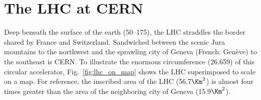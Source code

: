 \section{The LHC at CERN}
Deep beneath the surface of the earth (50--175\meter), the LHC straddles the border shared by France and Switzerland.
Sandwiched between the scenic Jura mountains to the northwest and the sprawling city of Geneva (French: Genève) to the southeast is CERN.
To illustrate the enormous circumference (26.659\Km) of this circular accelerator, Fig.~\ref{fig:lhc_on_map} shows the LHC superimposed to scale on a map.
For reference, the inscribed area of the LHC (56.7$\Km^{2}$) is almost four times greater than the area of the neighboring city of Geneva (15.9$\Km^{2}$).

